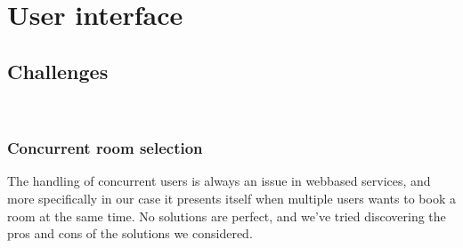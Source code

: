 \chapter{User interface}
\label{chap:user_interface}

\section{Challenges}
\label{sec:challenges}
\\
\subsection{Concurrent room selection}
The handling of concurrent users is always an issue in webbased services, and more specifically in our case it presents itself when multiple users wants to book a room at the same time. No solutions are perfect, and we've tried discovering the pros and cons of the solutions we considered.

